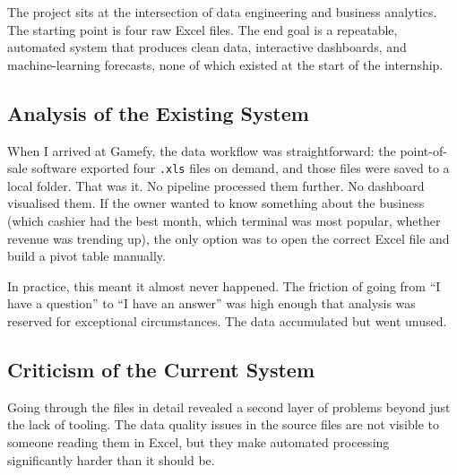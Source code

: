 \documentclass[12pt, a4paper]{report}
\begin{document}
The project sits at the intersection of data engineering and business analytics.
The starting point is four raw Excel files. The end goal is a repeatable,
automated system that produces clean data, interactive dashboards, and machine-learning
forecasts, none of which existed at the start of the internship.

\subsection{Analysis of the Existing System}

When I arrived at Gamefy, the data workflow was straightforward: the point-of-sale
software exported four \texttt{.xls} files on demand, and those files were saved
to a local folder. That was it. No pipeline processed them further. No dashboard
visualised them. If the owner wanted to know something about the business (which cashier had the
best month, which terminal was most popular, whether revenue was trending up),
the only option was to open the correct Excel file and build a pivot table manually.

In practice, this meant it almost never happened. The friction of going from
``I have a question'' to ``I have an answer'' was high enough that analysis was
reserved for exceptional circumstances. The data accumulated but went unused.

\subsection{Criticism of the Current System}

Going through the files in detail revealed a second layer of problems beyond
just the lack of tooling. The data quality issues in the source files are not
visible to someone reading them in Excel, but they make automated processing
significantly harder than it should be.
\end{document}
